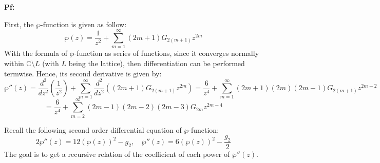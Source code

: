 \documentclass{article}
\begin{document}
\textbf{Pf:}

First, the $\wp$-function is given as follow:
$$\wp(z)=\frac{1}{z^2}+\sum_{m=1}^{\infty}(2m+1)G_{2(m+1)}z^{2m}$$
With the formula of $\wp$-function as series of functions, since it converges normally within $\mathbb{C}\setminus L$ (with $L$ being the lattice),
then differentiation can be performed termwise. Hence, its second derivative is given by:
$$\wp''(z)=\frac{d^2}{dz^2}\left(\frac{1}{z^2}\right)+\sum_{m=1}^{\infty}\frac{d^2}{dz^2}\left((2m+1)G_{2(m+1)}z^{2m}\right) = \frac{6}{z^4}+\sum_{m=1}^{\infty}(2m+1)(2m)(2m-1)G_{2(m+1)}z^{2m-2}$$
$$= \frac{6}{z^4}+\sum_{m=2}^{\infty}(2m-1)(2m-2)(2m-3)G_{2m}z^{2m-4}$$

Recall the following second order differential equation of $\wp$-function:
$$2\wp''(z)=12(\wp(z))^2-g_2,\quad \wp''(z)=6(\wp(z))^2-\frac{g_2}{2}$$
The goal is to get a recursive relation of the coefficient of each power of $\wp''(z)$.

\hfil
\end{document}
